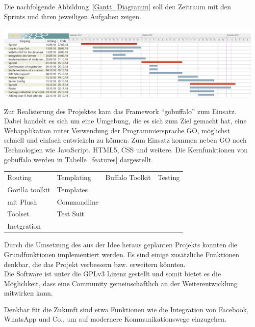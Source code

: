 \documentclass[landscape,a0paper,fontscale=0.35]{baposter} %
\begin{document}
\begin{poster}
{	Die nachfolgende Abbildung~\ref{Gantt_Diagramm} soll den Zeitraum mit den Sprints und ihren jeweiligen Aufgaben zeigen.
	\begin{center}
		\includegraphics[width=0.7\linewidth]{GanttDiagramm.PNG}
		\label{Gantt_Diagramm}
	\end{center}
}


{
	Zur Realisierung des Projektes kam das Framework \enquote{gobuffalo} zum Einsatz. Dabei handelt es sich um eine Umgebung, die es sich zum Ziel gemacht hat, eine Webapplikation unter Verwendung der Programmiersprache GO, möglichst schnell und einfach entwickeln zu können. Zum Einsatz kommen neben GO noch Technologien wie JavaScript, HTML5, CSS und weitere. Die Kernfunktionen von gobuffalo werden in Tabelle~\ref{features} dargestellt.
	\begin{center}
		\begin{tabu}{ l l l l }
			Routing & Templating & Buffalo Toolkit & Testing \\
			\tabucline[1pt]{-}
			Gorilla toolkit &Templates \\mit Plush& Commandline \\ Toolset. & Test Suit \\Inetgration
		\end{tabu}
	\label{features}
	\end{center}
}


{
	Durch die Umsetzung des aus der Idee heraus geplanten Projekts konnten die Grundfunktionen implementiert werden. Es sind einige zusätzliche Funktionen denkbar, die das Projekt verbessern bzw. erweitern könnten.\\
	Die Software ist unter die GPLv3 Lizenz gestellt und somit bietet es die Möglichkeit, dass eine Community gemeinschaftlich an der Weiterentwicklung mitwirken kann.

	Denkbar für die Zukunft sind etwa Funktionen wie die Integration von Facebook, WhatsApp und Co., um auf modernere Kommunikationswege einzugehen.
	\vspace{1.2em}
}


\end{poster}
\end{document}
